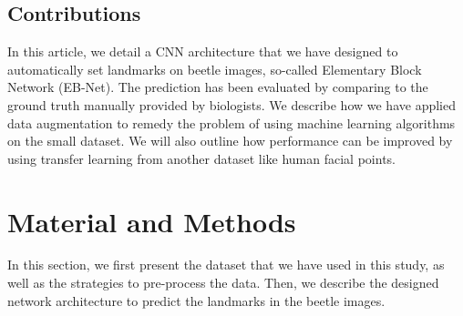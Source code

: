 \documentclass[review]{elsarticle}
\begin{document}
\subsection{Contributions}
In this article, we detail a CNN architecture that we have designed to automatically set landmarks on beetle images, so-called Elementary Block Network (EB-Net). The prediction has been evaluated by comparing to the ground truth manually provided by biologists. We describe how we have applied data augmentation to remedy the problem of using machine learning algorithms on the small dataset. We will also outline how performance can be improved by using transfer learning from another dataset like human facial points.

\section{Material and Methods}
\label{sec2}
In this section, we first present the dataset that we have used in this study, as well as the strategies to pre-process the data. Then, we describe the designed network architecture to predict the landmarks in the beetle images.
\end{document}

